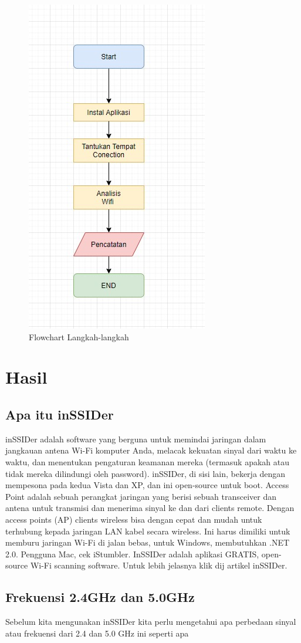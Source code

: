 \documentclass[conference]{IEEEtran}
\begin{document}
\begin{figure}[h]
\centering
    \includegraphics[width=.4\textwidth]{image/001.jpg}
     \caption{Flowchart Langkah-langkah}
\end{figure}

\section{Hasil}
\subsection{Apa itu inSSIDer}
inSSIDer adalah software yang berguna untuk memindai jaringan dalam jangkauan antena Wi-Fi komputer Anda, melacak kekuatan sinyal dari waktu ke waktu, dan menentukan pengaturan keamanan mereka (termasuk apakah atau tidak mereka dilindungi oleh password). inSSIDer, di sisi lain, bekerja dengan mempesona pada kedua Vista dan XP, dan ini open-source untuk boot. Access Point adalah sebuah perangkat jaringan yang berisi sebuah transceiver dan antena untuk transmisi dan menerima sinyal ke dan dari clients remote. Dengan access points (AP) clients wireless bisa dengan cepat dan mudah untuk terhubung kepada jaringan LAN kabel secara wireless. Ini harus dimiliki untuk memburu jaringan Wi-Fi di jalan bebas, untuk Windows, membutuhkan .NET 2.0. Pengguna Mac, cek iStumbler. InSSIDer adalah aplikasi GRATIS, open-source Wi-Fi scanning software. Untuk lebih jelasnya klik dij artikel inSSIDer.

\subsection{Frekuensi 2.4GHz dan 5.0GHz}
Sebelum kita mengunakan inSSIDer kita perlu mengetahui apa perbedaan sinyal atau frekuensi dari 2.4 dan 5.0 GHz ini seperti apa 
\vspace{2pt}
\end{document}
